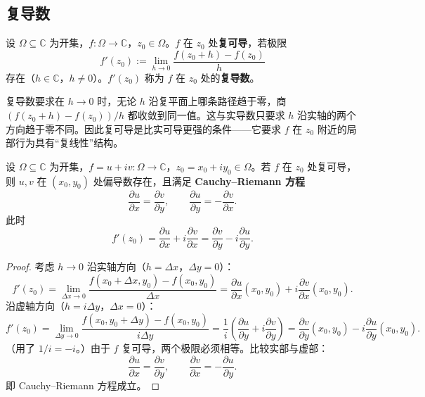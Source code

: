 \subsection{复导数}

\begin{definition}[复导数]\label{def:ca_complex_derivative}
设 $\Omega \subseteq \mathbb{C}$ 为开集，$f: \Omega \to \mathbb{C}$，$z_0 \in \Omega$。$f$ 在 $z_0$ 处\textbf{复可导}，若极限
\[
f'(z_0) := \lim_{h \to 0} \frac{f(z_0 + h) - f(z_0)}{h}
\]
存在（$h \in \mathbb{C}$，$h \neq 0$）。$f'(z_0)$ 称为 $f$ 在 $z_0$ 处的\textbf{复导数}。
\end{definition}

\begin{remark}[复导数与实导数的本质区别]\label{rem:ca_derivative_difference}
复导数要求在 $h \to 0$ 时，无论 $h$ 沿复平面上哪条路径趋于零，商 $(f(z_0 + h) - f(z_0))/h$ 都收敛到同一值。这与实导数只要求 $h$ 沿实轴的两个方向趋于零不同。因此复可导是比实可导更强的条件——它要求 $f$ 在 $z_0$ 附近的局部行为具有“复线性”结构。
\end{remark}

\begin{theorem}\label{thm:ca_cauchy_riemann}
设 $\Omega \subseteq \mathbb{C}$ 为开集，$f = u + iv: \Omega \to \mathbb{C}$，$z_0 = x_0 + iy_0 \in \Omega$。若 $f$ 在 $z_0$ 处复可导，则 $u, v$ 在 $(x_0, y_0)$ 处偏导数存在，且满足 \textbf{Cauchy--Riemann 方程}
\[
\frac{\partial u}{\partial x} = \frac{\partial v}{\partial y}, \qquad \frac{\partial u}{\partial y} = -\frac{\partial v}{\partial x}.
\]
此时
\[
f'(z_0) = \frac{\partial u}{\partial x} + i \frac{\partial v}{\partial x} = \frac{\partial v}{\partial y} - i \frac{\partial u}{\partial y}.
\]
\end{theorem}

\begin{proof}
考虑 $h \to 0$ 沿实轴方向（$h = \Delta x$，$\Delta y = 0$）：
\[
f'(z_0) = \lim_{\Delta x \to 0} \frac{f(x_0 + \Delta x, y_0) - f(x_0, y_0)}{\Delta x} = \frac{\partial u}{\partial x}(x_0, y_0) + i \frac{\partial v}{\partial x}(x_0, y_0).
\]
沿虚轴方向（$h = i \Delta y$，$\Delta x = 0$）：
\[
f'(z_0) = \lim_{\Delta y \to 0} \frac{f(x_0, y_0 + \Delta y) - f(x_0, y_0)}{i \Delta y} = \frac{1}{i} \left( \frac{\partial u}{\partial y} + i \frac{\partial v}{\partial y} \right) = \frac{\partial v}{\partial y}(x_0, y_0) - i \frac{\partial u}{\partial y}(x_0, y_0).
\]
（用了 $1/i = -i$。）由于 $f$ 复可导，两个极限必须相等。比较实部与虚部：
\[
\frac{\partial u}{\partial x} = \frac{\partial v}{\partial y}, \qquad \frac{\partial v}{\partial x} = -\frac{\partial u}{\partial y}.
\]
即 Cauchy--Riemann 方程成立。
\end{proof}

